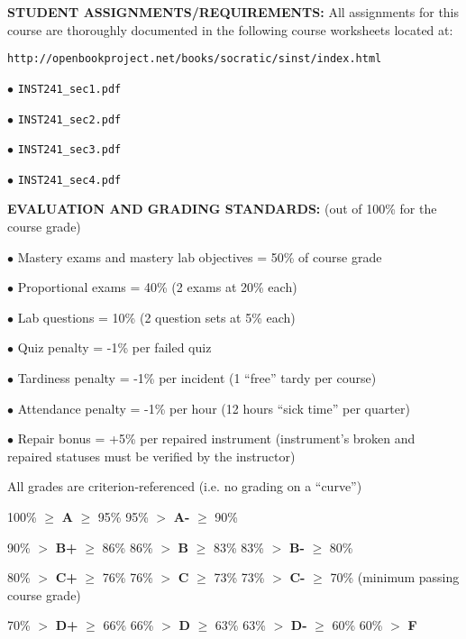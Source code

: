 \vskip 10pt

\noindent
{\bf STUDENT ASSIGNMENTS/REQUIREMENTS:} All assignments for this course are thoroughly documented in the following course worksheets located at:

\noindent
{\tt http://openbookproject.net/books/socratic/sinst/index.html} 

\vskip 5pt

\item{$\bullet$} {\tt INST241\_sec1.pdf} 
\item{$\bullet$} {\tt INST241\_sec2.pdf} 
\item{$\bullet$} {\tt INST241\_sec3.pdf} 
\item{$\bullet$} {\tt INST241\_sec4.pdf} 


\vfil \eject

\noindent
{\bf EVALUATION AND GRADING STANDARDS:} (out of 100\% for the course grade)

\item{$\bullet$} Mastery exams and mastery lab objectives = 50\% of course grade
\item{$\bullet$} Proportional exams = 40\% (2 exams at 20\% each)
\item{$\bullet$} Lab questions = 10\% (2 question sets at 5\% each)
\item{$\bullet$} Quiz penalty = -1\% per failed quiz
\item{$\bullet$} Tardiness penalty = -1\% per incident (1 ``free'' tardy per course)
\item{$\bullet$} Attendance penalty = -1\% per hour (12 hours ``sick time'' per quarter)
\item{$\bullet$} Repair bonus = +5\% per repaired instrument (instrument's broken and repaired statuses must be verified by the instructor)

\vskip 10pt

\noindent
All grades are criterion-referenced (i.e. no grading on a ``curve'')

\medskip
\item{} 100\% $\geq$ {\bf A} $\geq$ 95\% \hskip 33pt 95\% $>$ {\bf A-} $\geq$ 90\%
\item{} 90\% $>$ {\bf B+} $\geq$ 86\% \hskip 30pt 86\% $>$ {\bf B} $\geq$ 83\% \hskip 30pt 83\% $>$ {\bf B-} $\geq$ 80\%
\item{} 80\% $>$ {\bf C+} $\geq$ 76\% \hskip 30pt 76\% $>$ {\bf C} $\geq$ 73\% \hskip 30pt 73\% $>$ {\bf C-} $\geq$ 70\% (minimum passing course grade)
\item{} 70\% $>$ {\bf D+} $\geq$ 66\% \hskip 30pt 66\% $>$ {\bf D} $\geq$ 63\% \hskip 30pt 63\% $>$ {\bf D-} $\geq$ 60\% \hskip 30pt 60\% $>$ {\bf F}
\medskip

